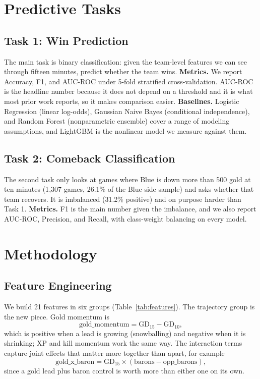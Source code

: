 \documentclass[sigconf,nonacm]{acmart}
\begin{document}
\section{Predictive Tasks}
\subsection{Task 1: Win Prediction}
The main task is binary classification: given the team-level features we can see through fifteen
minutes, predict whether the team wins. \textbf{Metrics.} We report Accuracy, F1, and AUC-ROC under
5-fold stratified cross-validation. AUC-ROC is the headline number because it does not depend on a
threshold and it is what most prior work reports, so it makes comparison easier. \textbf{Baselines.}
Logistic Regression (linear log-odds), Gaussian Naive Bayes (conditional independence), and Random
Forest (nonparametric ensemble) cover a range of modeling assumptions, and LightGBM is the
nonlinear model we measure against them.

\subsection{Task 2: Comeback Classification}
The second task only looks at games where Blue is down more than 500 gold at ten minutes
(1{,}307 games, 26.1\% of the Blue-side sample) and asks whether that team recovers. It is
imbalanced (31.2\% positive) and on purpose harder than Task 1. \textbf{Metrics.} F1 is the main
number given the imbalance, and we also report AUC-ROC, Precision, and Recall, with class-weight
balancing on every model.

\section{Methodology}
\subsection{Feature Engineering}
We build 21 features in six groups (Table~\ref{tab:features}). The trajectory group is the new
piece. Gold momentum is
\begin{equation}
  \text{gold\_momentum} = \text{GD}_{15} - \text{GD}_{10},
\end{equation}
which is positive when a lead is growing (snowballing) and negative when it is shrinking; XP and
kill momentum work the same way. The interaction terms capture joint effects that matter more
together than apart, for example
\begin{equation}
  \text{gold\_x\_baron} = \text{GD}_{15}\times(\text{barons}-\text{opp\_barons}),
\end{equation}
since a gold lead plus baron control is worth more than either one on its own.
\end{document}
